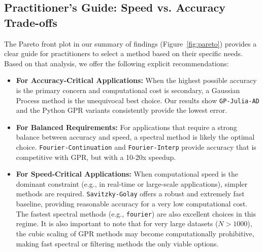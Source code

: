 \subsection{Practitioner's Guide: Speed vs. Accuracy Trade-offs}
The Pareto front plot in our summary of findings (Figure~\ref{fig:pareto}) provides a clear guide for practitioners to select a method based on their specific needs. Based on that analysis, we offer the following explicit recommendations:
\begin{itemize}
    \item \textbf{For Accuracy-Critical Applications:} When the highest possible accuracy is the primary concern and computational cost is secondary, a Gaussian Process method is the unequivocal best choice. Our results show \texttt{GP-Julia-AD} and the Python GPR variants consistently provide the lowest error.
    \item \textbf{For Balanced Requirements:} For applications that require a strong balance between accuracy and speed, a spectral method is likely the optimal choice. \texttt{Fourier-Continuation} and \texttt{Fourier-Interp} provide accuracy that is competitive with GPR, but with a 10-20x speedup.
    \item \textbf{For Speed-Critical Applications:} When computational speed is the dominant constraint (e.g., in real-time or large-scale applications), simpler methods are required. \texttt{Savitzky-Golay} offers a robust and extremely fast baseline, providing reasonable accuracy for a very low computational cost. The fastest spectral methods (e.g., \texttt{fourier}) are also excellent choices in this regime. It is also important to note that for very large datasets ($N > 1000$), the cubic scaling of GPR methods may become computationally prohibitive, making fast spectral or filtering methods the only viable options.
\end{itemize}
